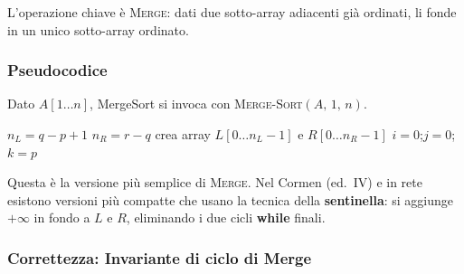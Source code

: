 \documentclass[a4paper, 11pt]{article}
\theoremstyle{definition}
\theoremstyle{remark}
\theoremstyle{remark}
\newenvironment{nota}{%
	\begin{tcolorbox}[
		colback=codebg,
		colframe=primary,
		fonttitle=\bfseries,
		title=Nota,
		left=6pt, right=6pt, top=4pt, bottom=4pt
		]
	}{%
	\end{tcolorbox}
}
\begin{document}
	L'operazione chiave è \textsc{Merge}: dati due sotto-array adiacenti già
	ordinati, li fonde in un unico sotto-array ordinato.
	
	\subsubsection{Pseudocodice}
	
	Dato $A[1 \ldots n]$, MergeSort si invoca con
	\textsc{Merge-Sort}$(A,\, 1,\, n)$.
	
	\begin{algorithm}[H]
		\caption{\textsc{Merge-Sort}$(A, p, r)$}
		\BlankLine
	\end{algorithm}
	
	\begin{algorithm}[H]
		\caption{\textsc{Merge}$(A, p, q, r)$}
		\BlankLine
		$n_L = q - p + 1$\;
		$n_R = r - q$\;
		crea array $L[0 \ldots n_L-1]$ e $R[0 \ldots n_R-1]$\;
		\BlankLine
		\BlankLine
		$i = 0$;\quad $j = 0$;\quad $k = p$\;
		\BlankLine
		\BlankLine
	\end{algorithm}
	
	\begin{nota}
		Questa è la versione più semplice di \textsc{Merge}. Nel Cormen (ed.\ IV)
		e in rete esistono versioni più compatte che usano la tecnica della
		\textbf{sentinella}: si aggiunge $+\infty$ in fondo a $L$ e $R$,
		eliminando i due cicli \textbf{while} finali.
	\end{nota}
	
	
	\subsubsection{Correttezza: Invariante di ciclo di Merge}
	
\end{document}
